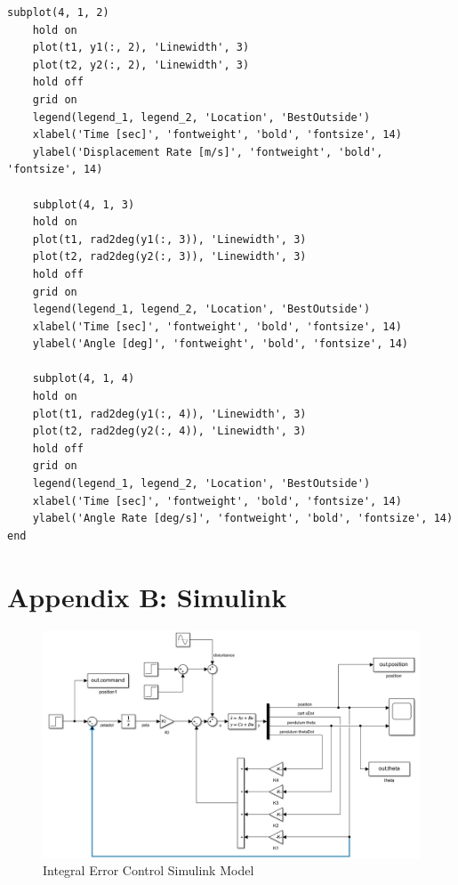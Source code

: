 \documentclass[titlepage]{article}
\begin{document}
\begin{lstlisting}[style=Matlab-editor]
    subplot(4, 1, 2)
    hold on
    plot(t1, y1(:, 2), 'Linewidth', 3)
    plot(t2, y2(:, 2), 'Linewidth', 3)
    hold off
    grid on
    legend(legend_1, legend_2, 'Location', 'BestOutside')
    xlabel('Time [sec]', 'fontweight', 'bold', 'fontsize', 14)
    ylabel('Displacement Rate [m/s]', 'fontweight', 'bold', 'fontsize', 14)

    subplot(4, 1, 3)
    hold on
    plot(t1, rad2deg(y1(:, 3)), 'Linewidth', 3)
    plot(t2, rad2deg(y2(:, 3)), 'Linewidth', 3)
    hold off
    grid on
    legend(legend_1, legend_2, 'Location', 'BestOutside')
    xlabel('Time [sec]', 'fontweight', 'bold', 'fontsize', 14)
    ylabel('Angle [deg]', 'fontweight', 'bold', 'fontsize', 14)
    
    subplot(4, 1, 4)
    hold on
    plot(t1, rad2deg(y1(:, 4)), 'Linewidth', 3)
    plot(t2, rad2deg(y2(:, 4)), 'Linewidth', 3)
    hold off
    grid on
    legend(legend_1, legend_2, 'Location', 'BestOutside')
    xlabel('Time [sec]', 'fontweight', 'bold', 'fontsize', 14)
    ylabel('Angle Rate [deg/s]', 'fontweight', 'bold', 'fontsize', 14)
end

\end{lstlisting}

\newpage
\section{Appendix B: Simulink}
\begin{figure}[h]
    \includegraphics[width=1\linewidth]{simulink_mdl.png}
    \caption{Integral Error Control Simulink Model}
    \label{fig:enter-label}
\end{figure}

\newpage
\end{document}
